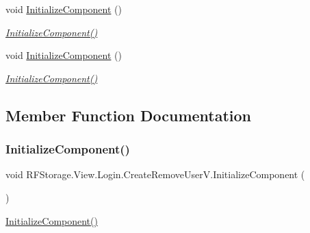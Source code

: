 \begin{DoxyCompactItemize}
void \mbox{\hyperlink{class_r_f_storage_1_1_view_1_1_login_1_1_create_remove_user_v_a697bd7e51938308bef2f5e96053dbecf}{Initialize\+Component}} ()
\begin{DoxyCompactList}\small\item\em \mbox{\hyperlink{class_r_f_storage_1_1_view_1_1_login_1_1_create_remove_user_v_a697bd7e51938308bef2f5e96053dbecf}{Initialize\+Component()}} \end{DoxyCompactList}\item 
void \mbox{\hyperlink{class_r_f_storage_1_1_view_1_1_login_1_1_create_remove_user_v_a697bd7e51938308bef2f5e96053dbecf}{Initialize\+Component}} ()
\begin{DoxyCompactList}\small\item\em \mbox{\hyperlink{class_r_f_storage_1_1_view_1_1_login_1_1_create_remove_user_v_a697bd7e51938308bef2f5e96053dbecf}{Initialize\+Component()}} \end{DoxyCompactList}\end{DoxyCompactItemize}


\subsection{Member Function Documentation}
\mbox{\label{class_r_f_storage_1_1_view_1_1_login_1_1_create_remove_user_v_a697bd7e51938308bef2f5e96053dbecf}} 
\subsubsection{\texorpdfstring{InitializeComponent()}{InitializeComponent()}\hspace{0.1cm}{\footnotesize\ttfamily [1/7]}}
{\footnotesize\ttfamily void R\+F\+Storage.\+View.\+Login.\+Create\+Remove\+User\+V.\+Initialize\+Component (\begin{DoxyParamCaption}{ }\end{DoxyParamCaption})}



\mbox{\hyperlink{class_r_f_storage_1_1_view_1_1_login_1_1_create_remove_user_v_a697bd7e51938308bef2f5e96053dbecf}{Initialize\+Component()}} 

\mbox{\label{class_r_f_storage_1_1_view_1_1_login_1_1_create_remove_user_v_a697bd7e51938308bef2f5e96053dbecf}} 
